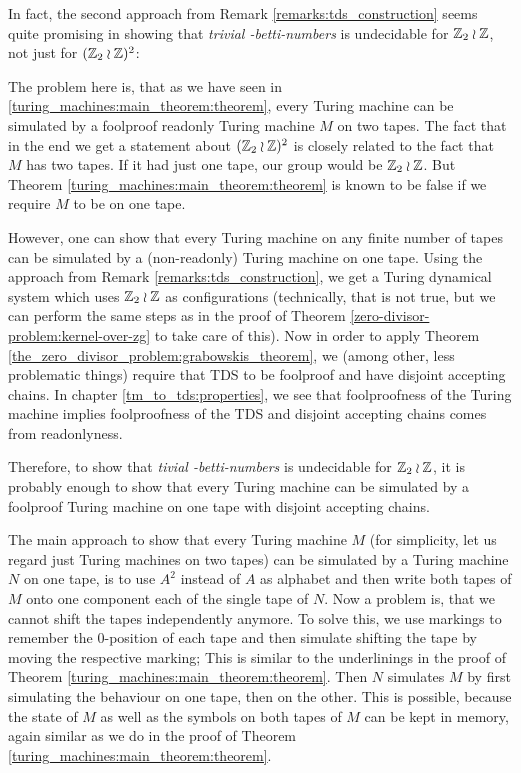 \begin{Remark}
	In fact, the second approach from Remark \ref{remarks:tds_construction} seems quite promising in showing that \emph{trivial \ltwo-betti-numbers} is undecidable for $\mathbb{Z}_2 \wr \mathbb{Z}$, not just for $(\mathbb{Z}_2 \wr \mathbb{Z})^2$:

	The problem here is, that as we have seen in \ref{turing_machines:main_theorem:theorem}, every Turing machine can be simulated by a foolproof readonly Turing machine $M$ on two tapes.
	The fact that in the end we get a statement about $(\mathbb{Z}_2 \wr \mathbb{Z})^2$ is closely related to the fact that $M$ has two tapes.
	If it had just one tape, our group would be $\mathbb{Z}_2 \wr \mathbb{Z}$.
	But Theorem \ref{turing_machines:main_theorem:theorem} is known to be false if we require $M$ to be on one tape.

	However, one can show that every Turing machine on any finite number of tapes can be simulated by a (non-readonly) Turing machine on one tape.
	Using the approach from Remark \ref{remarks:tds_construction}, we get a Turing dynamical system which uses $\mathbb{Z}_2 \wr \mathbb{Z}$ as configurations (technically, that is not true, but we can perform the same steps as in the proof of Theorem \ref{zero-divisor-problem:kernel-over-zg} to take care of this).
	Now in order to apply Theorem \ref{the_zero_divisor_problem:grabowskis_theorem}, we (among other, less problematic things) require that TDS to be foolproof and have disjoint accepting chains.
	In chapter \ref{tm_to_tds:properties}, we see that foolproofness of the Turing machine implies foolproofness of the TDS and disjoint accepting chains comes from readonlyness.

	Therefore, to show that \emph{tivial \ltwo-betti-numbers} is undecidable for $\mathbb{Z}_2 \wr \mathbb{Z}$, it is probably enough to show that every Turing machine can be simulated by a foolproof Turing machine on one tape with disjoint accepting chains.

	The main approach to show that every Turing machine $M$ (for simplicity, let us regard just Turing machines on two tapes) can be simulated by a Turing machine $N$ on one tape, is to use $A^2$ instead of $A$ as alphabet and then write both tapes of $M$ onto one component each of the single tape of $N$.
	Now a problem is, that we cannot shift the tapes independently anymore.
	To solve this, we use markings to remember the $0$-position of each tape and then simulate shifting the tape by moving the respective marking; This is similar to the underlinings in the proof of Theorem \ref{turing_machines:main_theorem:theorem}.
	Then $N$ simulates $M$ by first simulating the behaviour on one tape, then on the other.
	This is possible, because the state of $M$ as well as the symbols on both tapes of $M$ can be kept in memory, again similar as we do in the proof of Theorem \ref{turing_machines:main_theorem:theorem}.


\end{Remark}
